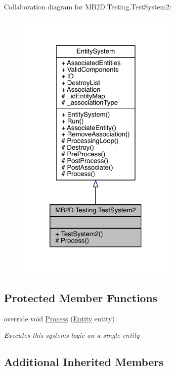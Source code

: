 Collaboration diagram for M\+B2\+D.\+Testing.\+Test\+System2\+:\nopagebreak
\begin{figure}[H]
\begin{center}
\leavevmode
\includegraphics[width=218pt]{class_m_b2_d_1_1_testing_1_1_test_system2__coll__graph}
\end{center}
\end{figure}
\subsection*{Protected Member Functions}
\begin{DoxyCompactItemize}
\item 
override void \hyperlink{class_m_b2_d_1_1_testing_1_1_test_system2_a0fbdd06fd0de796cfec32b7e025f73fe}{Process} (\hyperlink{class_m_b2_d_1_1_entity_component_1_1_entity}{Entity} entity)
\begin{DoxyCompactList}\small\item\em Executes this systems logic on a single entity \end{DoxyCompactList}\end{DoxyCompactItemize}
\subsection*{Additional Inherited Members}


